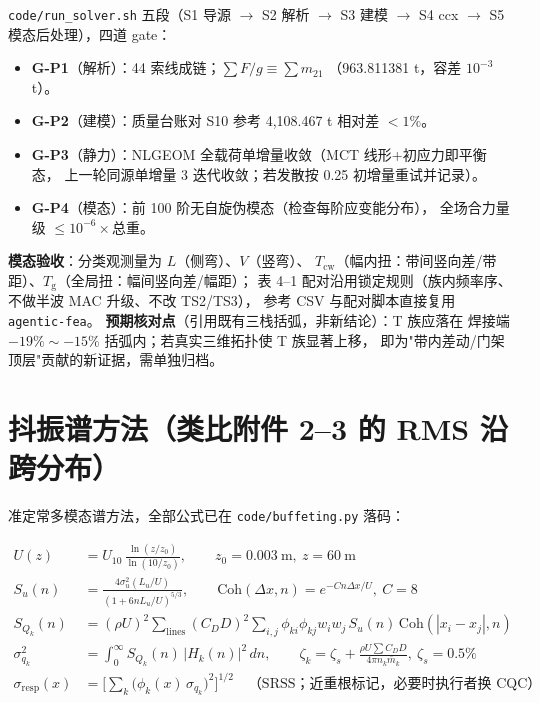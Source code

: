 \documentclass[11pt,a4paper]{ctexart}
\begin{document}
\texttt{code/run\_solver.sh} 五段（S1 导源 $\to$ S2 解析 $\to$ S3 建模 $\to$
S4 ccx $\to$ S5 模态后处理），四道 gate：

\begin{itemize}
  \item \textbf{G-P1}（解析）：44 索线成链；$\sum F/g \equiv \sum m_{21}$
        （963.811381 t，容差 $10^{-3}$ t）。
  \item \textbf{G-P2}（建模）：质量台账对 S10 参考 4{,}108.467 t 相对差 $<1\%$。
  \item \textbf{G-P3}（静力）：NLGEOM 全载荷单增量收敛（MCT 线形+初应力即平衡态，
        上一轮同源单增量 3 迭代收敛；若发散按 0.25 初增量重试并记录）。
  \item \textbf{G-P4}（模态）：前 100 阶无自旋伪模态（检查每阶应变能分布），
        全场合力量级 $\le 10^{-6}\times$总重。
\end{itemize}

\textbf{模态验收}：分类观测量为 $L$（侧弯）、$V$（竖弯）、
$T_{\text{cw}}$（幅内扭：带间竖向差/带距）、$T_{\text{g}}$（全局扭：幅间竖向差/幅距）；
表 4--1 配对沿用锁定规则（族内频率序、不做半波 MAC 升级、不改 TS2/TS3），
参考 CSV 与配对脚本直接复用 \texttt{agentic-fea}。
\textbf{预期核对点}（引用既有三栈括弧，非新结论）：T 族应落在
焊接端 $-19\%\sim-15\%$ 括弧内；若真实三维拓扑使 T 族显著上移，
即为"带内差动/门架顶层"贡献的新证据，需单独归档。

\section{抖振谱方法（类比附件 2--3 的 RMS 沿跨分布）}
\label{sec:buffeting}

准定常多模态谱方法，全部公式已在 \texttt{code/buffeting.py} 落码：

\begin{align}
U(z) &= U_{10}\,\frac{\ln(z/z_0)}{\ln(10/z_0)},\qquad z_0=0.003\ \text{m},\ z=60\ \text{m}\\
S_u(n) &= \frac{4\sigma_u^2 (L_u/U)}{(1+6 n L_u/U)^{5/3}},\qquad
\mathrm{Coh}(\Delta x,n) = e^{-C n \Delta x / U},\ C=8\\
S_{Q_k}(n) &= (\rho U)^2 \sum_{\text{lines}} (C_D D)^2
  \sum_{i,j}\phi_{ki}\phi_{kj} w_i w_j\, S_u(n)\,\mathrm{Coh}(|x_i-x_j|,n)\\
\sigma_{q_k}^2 &= \int_0^\infty S_{Q_k}(n)\,|H_k(n)|^2\,dn,\qquad
\zeta_k = \zeta_s + \frac{\rho U \sum C_D D}{4\pi n_k \bar m_k},\ \zeta_s=0.5\%\\
\sigma_{\text{resp}}(x) &= \Big[\sum_k \big(\phi_k(x)\,\sigma_{q_k}\big)^2\Big]^{1/2}
 \quad\text{（SRSS；近重根标记，必要时执行者换 CQC）}
\end{align}
\end{document}
